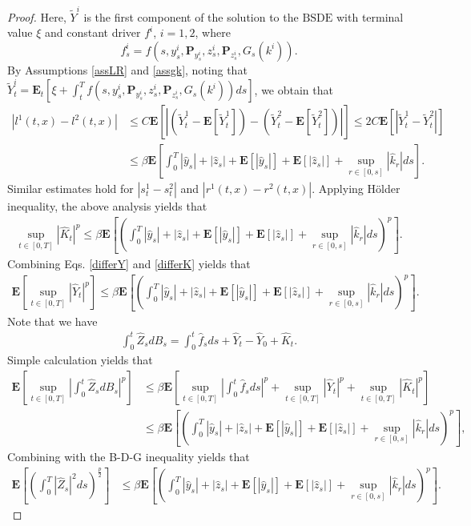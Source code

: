 \documentclass[10pt,a4paper]{amsart}
\def \E{\mathbf{E}}
\def \P{\mathbf{P}}
\begin{document}
\begin{proof}
Here, $\widetilde{Y}^i$ is the first component of the solution to the $\text{BSDE}$ with terminal value $\xi$ and constant driver $f^i$, $i=1,2$, where $$f^i_s=f\left(s,y_s^i,\P_{y_s^i},z_s^i,\P_{z^i_s},G_s(k^i)\right).$$ By Assumptions \ref{assLR} and \ref{assgk}, noting that $\widetilde{Y}^i_t=\E_t\left[\xi+\int_t^T f\left(s,y_s^i,\P_{y_s^i},z_s^i,\P_{z^i_s},G_s(k^i)\right)d s\right]$, we obtain that 
\begin{align*}
\left|l^1(t,x)-l^2(t,x)\right|&\leq C\E\left[\left|\left(\widetilde{Y}^1_t-\E[\widetilde{Y}^1_t]\right)-\left(\widetilde{Y}^2_t-\E[\widetilde{Y}^2_t]\right)\right|\right]\leq 2C\E[|\widetilde{Y}^1_t-\widetilde{Y}^2_t|]\\
&\leq \beta \E\left[\int_0^T |\hat{y}_s|+|\hat{z}_s|+\E[|\hat{y}_s|]+\E[|\hat{z}_s|]+\sup_{r\in[0,s]}|\hat{k}_r|d s\right ].
\end{align*}
Similar estimates hold for $|s^1_t-s^2_t|$ and $|r^1(t,x)-r^2(t,x)|$. 
Applying H{\"o}lder inequality, the above analysis yields that 
\begin{align}\label{differK}
\sup_{t\in[0,T]}|\hat{K}_t|^p\leq \beta\E\left[\left(\int_0^T |\hat{y}_s|+|\hat{z}_s|+\E[|\hat{y}_s|]+\E[|\hat{z}_s|]+\sup_{r\in[0,s]}|\hat{k}_r|ds\right)^p \right].
\end{align}
Combining Eqs. \eqref{differY} and \eqref{differK} yields that 
\begin{align*}
\E\left[\sup_{t\in[0,T]}|\hat{Y}_t|^p\right]\leq \beta\E\left[\left(\int_0^T |\hat{y}_s|+|\hat{z}_s|+\E[|\hat{y}_s|]+\E[|\hat{z}_s|]+\sup_{r\in[0,s]}|\hat{k}_r|d s \right)^p\right].
\end{align*}
Note that we have
\begin{align*}
\int_0^t \hat{Z}_s dB_s=\int_0^t\hat{f}_s ds+\hat{Y}_t-\hat{Y}_0+\hat{K}_t.
\end{align*}
Simple calculation yields that
\begin{align*}
\E\left[\sup_{t\in[0,T]}\left|\int_0^t \hat{Z}_sd B_s\right|^p\right]&\leq \beta\E\left[\sup_{t\in[0,T]}\left|\int_0^t\hat{f}_s ds\right|^p+\sup_{t\in[0,T]}|\hat{Y}_t|^p+\sup_{t\in[0,T]}|\hat{K}_t|^p\right]\\
&\leq \beta\E\left[\left(\int_0^T |\hat{y}_s|+|\hat{z}_s|+\E[|\hat{y}_s|]+\E[|\hat{z}_s|]+\sup_{r\in[0,s]}|\hat{k}_r| ds\right)^p\right],
\end{align*}
Combining with the B-D-G inequality yields that 
\begin{align*}
   \E\left[\left(\int_0^T |\hat{Z}_s|^2 d s\right)^{\frac{p}{2}}\right]&\leq \beta\E\left[\left(\int_0^T |\hat{y}_s|+|\hat{z}_s |+\E[|\hat{y}_s|]+\E[|\hat{z}_s|]+\sup_{r\in[0,s]}|\hat{k}_r| ds\right)^p\right].

\end{align*}
\end{proof}
\end{document}
